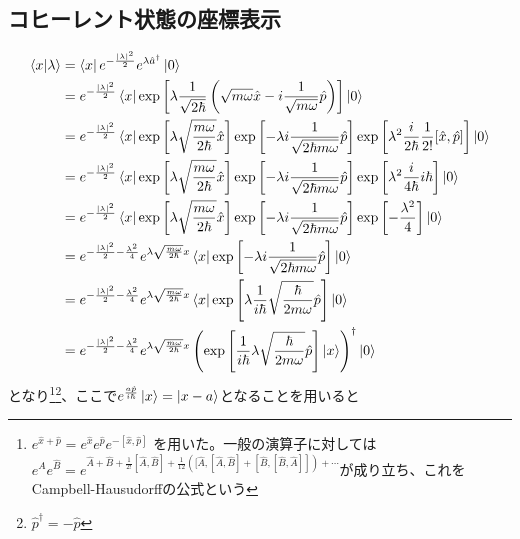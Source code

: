 \documentclass{jsarticle}  %
\numberwithin{equation}{section} %
\numberwithin{figure}{section}
\begin{document}
\subsection{コヒーレント状態の座標表示}
    \begin{align}
        \braket{x|\lambda} &= \bra{x} e^{-\frac{|\lambda|^2}{2} } e^{\lambda \hat{a}^\dagger} \ket{0} \notag \\
        &= e^{-\frac{|\lambda|^2}{2} }\bra{x} \exp\left[ \lambda \frac{1}{\sqrt{2\hbar}}\left( \sqrt{m\omega} \hat{x} -i \frac{1}{\sqrt{m\omega}} \hat{p}\right) \right]  \ket{0} \notag \\
        &= e^{-\frac{|\lambda|^2}{2} }\bra{x} \exp\left[ \lambda \sqrt{\frac{m\omega}{2\hbar }} \hat{x} \right]\exp\left[ -\lambda i \frac{1}{\sqrt{2\hbar m\omega}} \hat{p} \right] \exp\left[ \lambda^2 \frac{i}{2\hbar}\frac{1}{2!} [\hat{x},\hat{p}] \right] \ket{0}  \notag \\
        &= e^{-\frac{|\lambda|^2}{2} }\bra{x} \exp\left[ \lambda \sqrt{\frac{m\omega}{2\hbar }} \hat{x} \right]\exp\left[ -\lambda i \frac{1}{\sqrt{2\hbar m\omega}} \hat{p} \right] \exp\left[ \lambda^2 \frac{i}{4\hbar} i\hbar \right] \ket{0}  \notag \\
        &= e^{-\frac{|\lambda|^2}{2} }\bra{x} \exp\left[ \lambda \sqrt{\frac{m\omega}{2\hbar }} \hat{x} \right]\exp\left[ -\lambda i \frac{1}{\sqrt{2\hbar m\omega}} \hat{p} \right] \exp\left[ -\frac{\lambda^2}{4} \right] \ket{0}  \notag \\
        &= e^{-\frac{|\lambda|^2}{2} -\frac{\lambda^2}{4} }e^{\lambda \sqrt{\frac{m\omega}{2\hbar }} x }\bra{x}\exp\left[ -\lambda i \frac{1}{\sqrt{2\hbar m\omega}} \hat{p} \right] \ket{0} \notag \\
        &= e^{-\frac{|\lambda|^2}{2} -\frac{\lambda^2}{4} }e^{\lambda \sqrt{\frac{m\omega}{2\hbar }} x }\bra{x}\exp\left[ \lambda \frac{1}{i\hbar} \sqrt{\frac{\hbar }{2m\omega}}\hat{p} \right] \ket{0} \notag \\
        &= e^{-\frac{|\lambda|^2}{2} -\frac{\lambda^2}{4} }e^{\lambda \sqrt{\frac{m\omega}{2\hbar }} x }\left( \exp\left[ \frac{1}{i\hbar} \lambda \sqrt{\frac{\hbar }{2m\omega}}\hat{p} \right] \ket{x} \right)^\dagger \ket{0} 
    \end{align}
    となり\footnote{$e^{ \hat{x} + \hat{p} } = e^{\hat{x}}e^{\hat{p}} e^{-[\hat{x},\hat{p}]}$ を用いた。一般の演算子に対しては $e^{\hat{A}} e^{\hat{B}} = e^{\hat{A} + \hat{B} + \frac{1}{2!}[\hat{A}, \hat{B}] + \frac{1}{12}([\hat{A},[\hat{A},\hat{B}]+[\hat{B},[\hat{B},\hat{A}]])+\cdots}$が成り立ち、これをCampbell-Hausudorffの公式という}\footnote{$\hat{p}^\dagger = -\hat{p}$}、ここで$e^{\frac{a\hat{p}}{i\hbar}}\ket{x}=\ket{x-a}$となることを用いると
\end{document}
